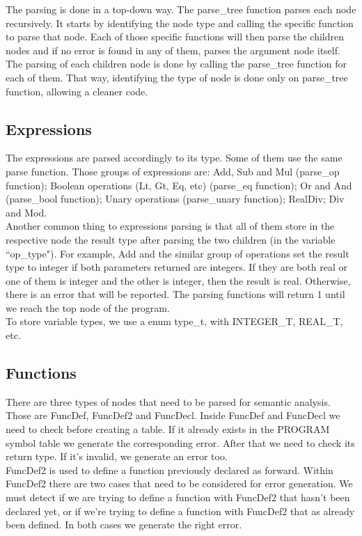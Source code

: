 \documentclass[12pt]{article}
\begin{document}
The parsing is done in a top-down way. The parse\_tree function parses each node recursively. It starts by identifying the node type and calling the specific function to parse that node. Each of those specific functions will then parse the children nodes and if no error is found in any of them, parses the argument node itself. The parsing of each children node is done by calling the parse\_tree function for each of them. That way, identifying the type of node is done only on parse\_tree function, allowing a cleaner code.\\

\subsection{Expressions}

The expressions are parsed accordingly to its type. Some of them use the same parse function. Those groups of expressions are: Add, Sub and Mul (parse\_op function); Boolean operations (Lt, Gt, Eq, etc) (parse\_eq function); Or and And (parse\_bool function); Unary operations (parse\_unary function); RealDiv; Div and Mod.\\
Another common thing to expressions parsing is that all of them store in the respective node the result type after parsing the two children (in the variable ``op\_type"). For example, Add and the similar group of operations set the result type to integer if both parameters returned are integers. If they are both real or one of them is integer and the other is integer, then the result is real. Otherwise, there is an error that will be reported. The parsing functions will return 1 until we reach the top node of the program.\\
To store variable types, we use a enum type\_t, with INTEGER\_T, REAL\_T, etc.\\

\subsection{Functions}
There are three types of nodes that need to be parsed for semantic analysis. Those are FuncDef, FuncDef2 and FuncDecl. Inside FuncDef and FuncDecl we need to check before creating a table. If it already exists in the PROGRAM symbol table we generate the corresponding error. After that we need to check its return type. If it's invalid, we generate an error too. \\
FuncDef2 is used to define a function previously declared as forward. Within FuncDef2 there are two cases that need to be considered for error generation. We must detect if we are trying to define a function with FuncDef2 that hasn't been declared yet, or if we're trying to define a function with FuncDef2 that as already been defined. In both cases we generate the right error.
\end{document}
